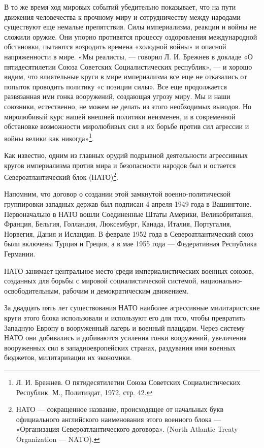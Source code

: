 \documentclass[12pt, a4paper, openany]{book}
\begin{document}
В то же время ход мировых событий убедительно показывает, что на пути движения человечества к прочному миру и сотрудничеству между народами существуют еще немалые препятствия. Силы империализма, реакции и войны не сложили оружие. Они упорно противятся процессу оздоровления международной обстановки, пытаются возродить времена «холодной войны» и опасной напряженности в мире. «Мы реалисты, — говорил Л. И. Брежнев в докладе «О пятидесятилетии Союза Советских Социалистических республик», — и хорошо видим, что влиятельные круги в мире империализма все еще не отказались от попыток проводить политику «с позиции силы». Все еще продолжается развязанная ими гонка вооружений, создающая угрозу миру. Мы и наши союзники, естественно, не можем не делать из этого необходимых выводов. Но миролюбивый курс нашей внешней политики неизменен, и в современной обстановке возможности миролюбивых сил в их борьбе против сил агрессии и войны велики как никогда»{\footnote{Л. И. Брежнев. О пятидесятилетии Союза Советских Социалистических Республик. М., Политиздат, 1972, стр. 42.}}.

Как известно, одним из главных орудий подрывной деятельности агрессивных кругов империализма против мира и безопасности народов был и остается Североатлантический блок (НАТО){\footnote{НАТО — сокращенное название, происходящее от начальных букв официального английского наименования этого военного блока — «Организация Североатлантического договора». (North Atlantic Treaty Organization — NATO).}}.

Напомним, что договор о создании этой замкнутой военно-политической группировки западных держав был подписан 4 апреля 1949 года в Вашингтоне. Первоначально в НАТО вошли Соединенные Штаты Америки, Великобритания, Франция, Бельгия, Голландия, Люксембург, Канада, Италия, Португалия, Норвегия, Дания и Исландия. В феврале 1952 года в Североатлантический союз были включены Турция и Греция, а в мае 1955 года — Федеративная Республика Германии.

НАТО занимает центральное место среди империалистических военных союзов, созданных для борьбы с мировой социалистической системой, национально-освободительным, рабочим и демократическим движением.

За двадцать пять лет существования НАТО наиболее агрессивные милитаристские круги этого блока использовали и используют его для того, чтобы превратить Западную Европу в вооруженный лагерь и военный плацдарм. Через систему НАТО они добивались и добиваются усиления гонки вооружений, увеличения вооруженных сил в западноевропейских странах, раздувания ими военных бюджетов, милитаризации их экономики.
\end{document}
